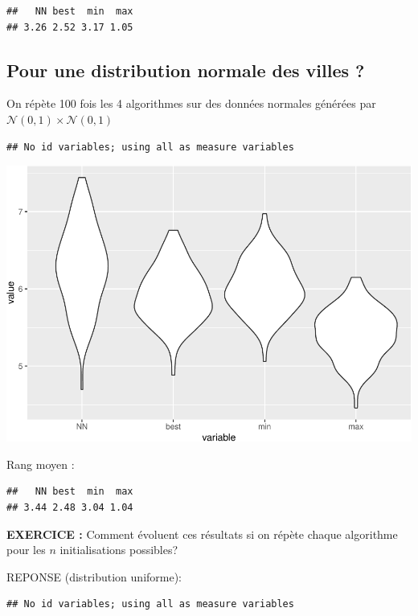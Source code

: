 \documentclass[
]{article}
\begin{document}
\begin{verbatim}
##   NN best  min  max 
## 3.26 2.52 3.17 1.05
\end{verbatim}

\hypertarget{pour-une-distribution-normale-des-villes}{%
\subsection{Pour une distribution normale des villes
?}\label{pour-une-distribution-normale-des-villes}}

On répète 100 fois les 4 algorithmes sur des données normales générées
par \(\mathcal{N}(0,1) \times \mathcal{N}(0,1)\)

\begin{verbatim}
## No id variables; using all as measure variables
\end{verbatim}

\includegraphics{rapport_TSP_files/figure-latex/plot violon-1.pdf}

Rang moyen :

\begin{verbatim}
##   NN best  min  max 
## 3.44 2.48 3.04 1.04
\end{verbatim}

\textbf{EXERCICE :} Comment évoluent ces résultats si on répète chaque
algorithme pour les \(n\) initialisations possibles?

REPONSE (distribution uniforme):

\begin{verbatim}
## No id variables; using all as measure variables
\end{verbatim}
\end{document}
